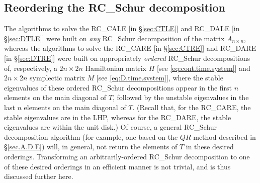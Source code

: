 \enlargethispage{7pt}
\subsection{Reordering the RC_Schur decomposition}\label{sec:ReorderedRC_Schur}

The algorithms to solve the RC_CALE [in \S \ref{sec:CTLE}] and RC_DALE [in \S \ref{sec:DTLE}] were built on {\it any} RC_Schur decomposition of
the matrix $A_{n\times n}$, whereas the algorithms to solve the RC_CARE [in \S \ref{sec:CTRE}] and RC_DARE [in \S \ref{sec:DTRE}] were built on appropriately {\it ordered} RC_Schur
decompositions of, respectively, a ${2n\times 2n}$ Hamiltonian matrix $H$ [see \eqref{eq:cont.time.system}] and ${2n\times 2n}$ symplectic matrix $M$ [see \eqref{eq:D.time.system}],
where the stable eigenvalues of these ordered RC_Schur decompositions appear in the first $n$ elements on the main diagonal of $T$, followed by the unstable eigenvalues in the last $n$
elements on the main diagonal of $T$.  (Recall that, for the RC_CARE, the stable eigenvalues are in the LHP, whereas for the RC_DARE, the stable eigenvalues are within the unit disk.)
Of course, a general RC_Schur decomposition algorithm (for example, one based on the $QR$ method described in \S \ref{sec.A.D.E})
will, in general, not return the elements of $T$ in these desired orderings.  Transforming an arbitrarily-ordered RC_Schur decomposition
to one of these desired orderings in an efficient manner is not trivial, and is thus discussed further here.

